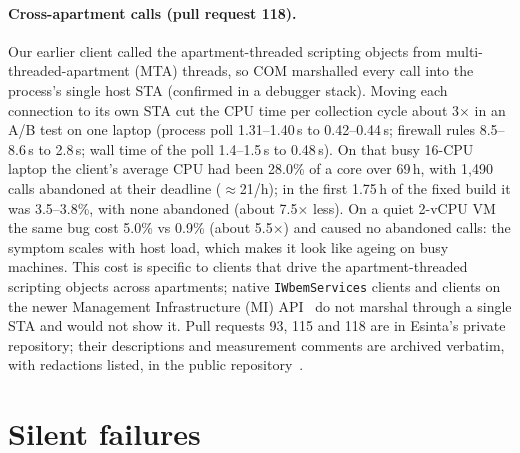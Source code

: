 \documentclass[letterpaper,twocolumn,10pt]{article}
\newcommand{\code}[1]{\texttt{\small #1}}
\begin{document}
\paragraph{Cross-apartment calls (pull request 118).}
Our earlier client called the apartment-threaded scripting objects from multi-threaded-apartment (MTA) threads, so COM marshalled every call into the process's single host STA (confirmed in a debugger stack).
Moving each connection to its own STA cut the CPU time per collection cycle about 3$\times$ in an A/B test on one laptop (process poll 1.31--1.40\,s to 0.42--0.44\,s; firewall rules 8.5--8.6\,s to 2.8\,s; wall time of the poll 1.4--1.5\,s to 0.48\,s).
On that busy 16-CPU laptop the client's average CPU had been 28.0\% of a core over 69\,h, with 1{,}490 calls abandoned at their deadline ($\approx$21/h); in the first 1.75\,h of the fixed build it was 3.5--3.8\%, with none abandoned (about 7.5$\times$ less).
On a quiet 2-vCPU VM the same bug cost 5.0\% vs 0.9\% (about 5.5$\times$) and caused no abandoned calls: the symptom scales with host load, which makes it look like ageing on busy machines.
This cost is specific to clients that drive the apartment-threaded scripting objects across apartments; native \code{IWbemServices} clients and clients on the newer Management Infrastructure (MI) API~\cite{ms-mi} do not marshal through a single STA and would not show it.
Pull requests 93, 115 and 118 are in Esinta's private repository; their descriptions and measurement comments are archived verbatim, with redactions listed, in the public repository~\cite{repo}.

\section{Silent failures}\label{sec:silent}
\end{document}
